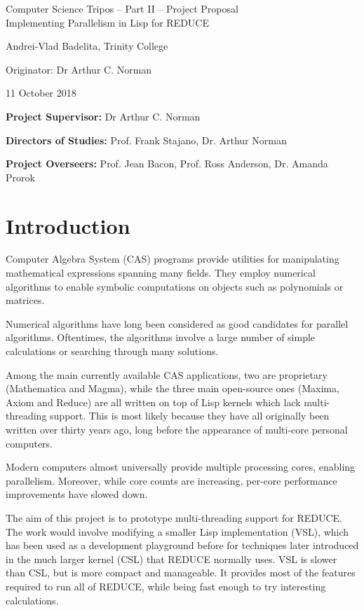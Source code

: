 \documentclass[12pt,a4paper,twoside]{article}
\begin{document}
\begin{center}
\Large
Computer Science Tripos -- Part II -- Project Proposal\\[4mm]
\LARGE
Implementing Parallelism in Lisp for REDUCE

\large
Andrei-Vlad Badelita, Trinity College

Originator: Dr Arthur C. Norman

11 October 2018
\end{center}

\vspace{5mm}

\textbf{Project Supervisor:} Dr Arthur C. Norman

\textbf{Directors of Studies:} Prof. Frank Stajano, Dr. Arthur Norman 

\textbf{Project Overseers:} Prof. Jean Bacon, Prof. Ross Anderson, Dr. Amanda Prorok


\section*{Introduction}

Computer Algebra System (CAS) programs provide utilities for manipulating mathematical expressions 
spanning many fields. They employ  numerical algorithms to enable symbolic computations
on objects such as polynomials or matrices.

Numerical algorithms have long been considered as good candidates for parallel algorithms.
Oftentimes, the algorithms involve a large number of simple calculations or searching through
many solutions.

Among the main currently available CAS applications, two are proprietary (Mathematica and Magma),
while the three main open-source ones (Maxima, Axiom and Reduce) are all written on top of Lisp
kernels which lack multi-threading support. This is most likely because they have all originally been
written over thirty years ago, long before the appearance of multi-core personal computers.

Modern computers almost universally provide multiple processing cores, enabling parallelism.
Moreover, while core counts are increasing, per-core performance improvements have slowed down.

The aim of this project is to prototype multi-threading support for REDUCE. The work would involve
modifying a smaller Lisp implementation (VSL), which has been used as a development playground
before for techniques later introduced in the much larger kernel (CSL) that REDUCE normally uses.
VSL is slower than CSL, but is more compact and manageable. It provides 
most of the features required to run all of REDUCE, while being fast enough to try
interesting calculations.
\end{document}
